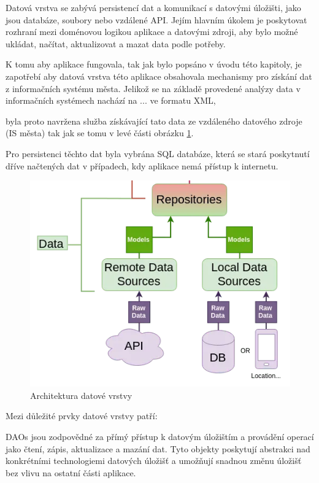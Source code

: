 Datová vrstva se zabývá persistencí dat a komunikací s datovými úložišti, jako jsou
databáze, soubory nebo vzdálené API. Jejím hlavním úkolem je poskytovat rozhraní mezi doménovou logikou aplikace a datovými zdroji, 
aby bylo možné ukládat, načítat, aktualizovat a mazat data podle potřeby.

K tomu aby aplikace fungovala, tak jak bylo popsáno v úvodu této kapitoly, je zapotřebí aby datová vrstva této aplikace obsahovala mechanismy pro
 získání dat z informačních systému města. Jelikož se na základě provedené analýzy data v informačních systémech nachází na ... ve formatu XML, 


 byla proto navržena služba získávající tato data ze vzdáleného datového zdroje (IS města) tak jak se tomu v levé části obrázku \ref{fig:arch_data_layer}. 

Pro persistenci těchto dat byla vybrána SQL databáze, která se stará poskytnutí dříve načtených dat v případech, kdy aplikace nemá přístup k internetu.


\begin{figure}[H]
  \centering
  \includegraphics[width=.5\textwidth]{data_layer_diagram.png}
  \caption{Architektura datové vrstvy}
  \label{fig:arch_data_layer}
\end{figure}


Mezi důležité prvky datové vrstvy patří:

DAOs jsou zodpovědné za přímý přístup k datovým úložištím a provádění operací jako čtení, zápis, aktualizace a mazání dat. Tyto objekty 
poskytují abstrakci nad konkrétními technologiemi datových úložišť a umožňují snadnou změnu úložišť bez vlivu na ostatní části aplikace.

